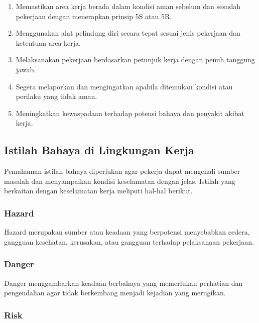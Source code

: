 \begin{enumerate}[leftmargin=*,itemsep=2pt]
\item Memastikan area kerja berada dalam kondisi aman sebelum dan sesudah pekerjaan dengan menerapkan prinsip 5S atau 5R.

\item Menggunakan alat pelindung diri secara tepat sesuai jenis pekerjaan dan ketentuan area kerja.

\item Melaksanakan pekerjaan berdasarkan petunjuk kerja dengan penuh tanggung jawab.

\item Segera melaporkan dan mengingatkan apabila ditemukan kondisi atau perilaku yang tidak aman.

\item Meningkatkan kewaspadaan terhadap potensi bahaya dan penyakit akibat kerja.

\end{enumerate}

\subsection{Istilah Bahaya di Lingkungan Kerja}

Pemahaman istilah bahaya diperlukan agar pekerja dapat mengenali sumber masalah dan menyampaikan kondisi keselamatan dengan jelas. Istilah yang berkaitan dengan keselamatan kerja meliputi hal-hal berikut.

\subsubsection{Hazard}

Hazard merupakan sumber atau keadaan yang berpotensi menyebabkan cedera, gangguan kesehatan, kerusakan, atau gangguan terhadap pelaksanaan pekerjaan.

\subsubsection{Danger}

Danger menggambarkan keadaan berbahaya yang memerlukan perhatian dan pengendalian agar tidak berkembang menjadi kejadian yang merugikan.

\subsubsection{Risk}

